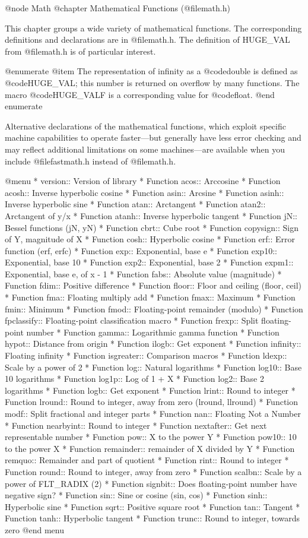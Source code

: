 @node Math
@chapter Mathematical Functions (@file{math.h})

This chapter groups a wide variety of mathematical functions.  The
corresponding definitions and declarations are in @file{math.h}.  
The definition of HUGE_VAL from @file{math.h} is of particular interest.

@enumerate
@item
The representation of infinity as a @code{double} is defined as
@code{HUGE_VAL}; this number is returned on overflow by many functions.
The macro @code{HUGE_VALF} is a corresponding value for @code{float}.
@end enumerate

Alternative declarations of the mathematical functions, which exploit
specific machine capabilities to operate faster---but generally have
less error checking and may reflect additional limitations on some
machines---are available when you include @file{fastmath.h} instead of
@file{math.h}.

@menu 
* version::	Version of library
* Function acos::	Arccosine
* Function acosh::	Inverse hyperbolic cosine
* Function asin::	Arcsine
* Function asinh::	Inverse hyperbolic sine
* Function atan::	Arctangent
* Function atan2::	Arctangent of y/x
* Function atanh::	Inverse hyperbolic tangent
* Function jN::	        Bessel functions (jN, yN)
* Function cbrt::	Cube root
* Function copysign::	Sign of Y, magnitude of X
* Function cosh::	Hyperbolic cosine
* Function erf::		Error function (erf, erfc)
* Function exp::		Exponential, base e
* Function exp10::	Exponential, base 10
* Function exp2::	Exponential, base 2
* Function expm1::	Exponential, base e, of x - 1
* Function fabs::	Absolute value (magnitude)
* Function fdim::	Positive difference
* Function floor::	Floor and ceiling (floor, ceil)
* Function fma::		Floating multiply add
* Function fmax::	Maximum
* Function fmin::	Minimum
* Function fmod::	Floating-point remainder (modulo)
* Function fpclassify::	Floating-point classification macro
* Function frexp::	Split floating-point number
* Function gamma::	Logarithmic gamma function
* Function hypot::	Distance from origin
* Function ilogb::	Get exponent
* Function infinity::	Floating infinity
* Function isgreater::	Comparison macros
* Function ldexp::	Scale by a power of 2
* Function log::		Natural logarithms
* Function log10::	Base 10 logarithms
* Function log1p::	Log of 1 + X
* Function log2::	Base 2 logarithms
* Function logb::	Get exponent
* Function lrint::	Round to integer
* Function lround::	Round to integer, away from zero (lround, llround)
* Function modf::	Split fractional and integer parts
* Function nan::		Floating Not a Number
* Function nearbyint::	Round to integer
* Function nextafter::	Get next representable number
* Function pow::		X to the power Y
* Function pow10::	10 to the power X
* Function remainder::	remainder of X divided by Y
* Function remquo::	Remainder and part of quotient
* Function rint::	Round to integer
* Function round::	Round to integer, away from zero
* Function scalbn::	Scale by a power of FLT_RADIX (2)
* Function signbit::	Does floating-point number have negative sign?
* Function sin::		Sine or cosine (sin, cos)
* Function sinh::	Hyperbolic sine
* Function sqrt::	Positive square root
* Function tan::		Tangent
* Function tanh::	Hyperbolic tangent
* Function trunc::	Round to integer, towards zero
@end menu

